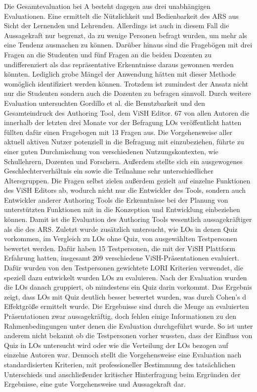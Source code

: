 \documentclass[conference]{IEEEtran}
\begin{document}
Die Gesamtevaluation bei A besteht dagegen aus drei unabhängigen Evaluationen. Eine ermittelt die Nützlichkeit und Bedienbarkeit des ARS aus Sicht der Lernenden und Lehrenden. Allerdings ist auch in diesem Fall die Aussagekraft nur begrenzt, da zu wenige Personen befragt wurden, um mehr als eine Tendenz ausmachen zu können. Darüber hinaus sind die Fragebögen mit drei Fragen an die Studenten und fünf Fragen an die beiden Dozenten zu undifferenziert als das repräsentative Erkenntnisse daraus gewonnen werden könnten. Lediglich grobe Mängel der Anwendung hätten mit dieser Methode womöglich identifiziert werden können. Trotzdem ist zumindest der Ansatz nicht nur die Studenten sondern auch die Dozenten zu befragen sinnvoll.
Durch weitere Evaluation untersuchten Gordillo et al. die Benutzbarkeit und den Gesamteindruck des Authoring Tool, dem ViSH Editor. 67 von allen Autoren die innerhalb der letzten drei Monate vor der Befragung LOs veröffentlicht hatten füllten dafür einen Fragebogen mit 13 Fragen aus. Die Vorgehensweise aller aktuell aktiven Nutzer potenziell in die Befragung mit einzubeziehen, führte zu einer guten Durchmischung von verschiedenen Nutzungskontexten, wie Schullehrern, Dozenten und Forschern. Außerdem stellte sich ein ausgewogenes Geschlechterverhältnis ein sowie die Teilnahme sehr unterschiedlicher Altersgruppen. Die Fragen selbst zielen außerdem gezielt auf einzelne Funktionen des ViSH Editors ab, wodurch nicht nur die Entwickler des Tools, sondern auch Entwickler anderer Authoring Tools die Erkenntnisse bei der Planung von unterstützten Funktionen mit in die Konzeption und Entwicklung einbeziehen können. Damit ist die Evaluation des Authoring Tools wesentlich aussagekräftiger als die des ARS.
Zuletzt wurde zusätzlich untersucht, wie LOs in denen Quiz vorkommen, im Vergleich zu LOs ohne Quiz, von ausgewählten Testpersonen bewertet werden. Dafür haben 15 Testpersonen, die mit der ViSH Plattform Erfahrung hatten, insgesamt 209 verschiedene ViSH-Präsentationen evaluiert. Dafür wurden von den Testpersonen gewichtete LORI Kriterien verwendet, die speziell dazu entwickelt wurden LOs zu evaluieren. Nach der Evaluation wurden die LOs danach gruppiert, ob mindestens ein Quiz darin vorkommt. Das Ergebnis zeigt, dass LOs mit Quiz deutlich besser bewertet wurden, was durch Cohen's d Effektgröße ermittelt wurde. Die Ergebnisse sind durch die Menge an evaluierten Präsentationen zwar aussagekräftig, doch fehlen einige Informationen zu den Rahmenbedingungen unter denen die Evaluation durchgeführt wurde. So ist unter anderem nicht bekannt ob die Testpersonen vorher wussten, dass der Einfluss von Quiz in LOs untersucht wird oder wie die Verteilung der LOs bezogen auf einzelne Autoren war. Dennoch stellt die Vorgehensweise eine Evaluation nach standardisierten Kriterien, mit professioneller Bestimmung des tatsächlichen Unterschieds und anschließender kritischer Hinterfragung beim Ergründen der Ergebnisse, eine gute Vorgehensweise und Aussagekraft dar.
\end{document}
